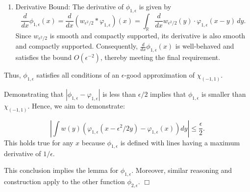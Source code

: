 \documentclass{article}
\newenvironment{proof}{\noindent {\bf Proof:}}{$\Box$ \vspace{2 ex}}
\begin{document}
\begin{proof}
\begin{enumerate}
\begin{equation*} \left| \int_{a}^{b} x e^{-imx^2} e^{-i\alpha x} \, dx \right|, \end{equation*} 
where $a$ and $b$ are fixed. Changing variables, this integral becomes \begin{equation*} \left| \int_{a'}^{b'} \frac{x - \frac{\alpha}{2\sqrt{|m|}}}{|m|} e^{-ix^2} , dx \right|, \end{equation*} where \begin{equation*} a' = a\sqrt{|m|} + \frac{\alpha}{2\sqrt{|m|}} \quad \text{and} \quad b' = b\sqrt{|m|} + \frac{\alpha}{2\sqrt{|m|}}. \end{equation*} This gives the bound \begin{equation*} O\left(\frac{1 + |\alpha| / |m|}{\sqrt{|m|}} \right). 
\end{equation*}

Finally, note that the slope of the linear regions in $\varphi_{1, \epsilon}$ is $O(\epsilon^{-1})$ by definition. This ensures that any contributions from the linear parts are controlled and satisfy the Fourier decay condition.

\item Derivative Bound: The derivative of $\phi_{1, \epsilon}$ is given by
    \begin{equation*}
    \frac{d}{dx} \phi_{1, \epsilon}(x) = \frac{d}{dx} \left( w_{\epsilon^2 / 2} * \varphi_{1, \epsilon} \right)(x) = \int_{\mathbb{R}} \frac{d}{dx} w_{\epsilon^2 / 2}(y) \cdot \varphi_{1, \epsilon}(x - y) \, dy.
    \end{equation*}
  Since $w_{\epsilon^2 / 2}$ is smooth and compactly supported, its derivative is also smooth and compactly supported. Consequently, $\frac{d}{dx} \phi_{1, \epsilon}(x)$ is well-behaved and satisfies the bound $O(\epsilon^{-2})$, thereby meeting the final requirement.

\end{enumerate}
Thus, $\phi_{1, \epsilon}$ satisfies all conditions of an $\epsilon$-good approximation of $\chi_{(-1,1)}$.

Demonstrating that $|\phi_{1,\epsilon}-\varphi_{1,\epsilon}|$ is less than $\epsilon/2$ implies that $\phi_{1,\epsilon}$ is smaller than $\chi_{(-1,1)}$. Hence, we aim to demonstrate:   

\begin{equation*}
\left|\int w(y) \left(\varphi_{1,\epsilon}(x-\epsilon^2/2y) - \varphi_{1,\epsilon}(x)\right) dy\right| \leq \frac{\epsilon}{2}.
\end{equation*}
This holds true for any $x$ because $\phi_{1,\epsilon}$ is defined with lines having a maximum derivative of $1/\epsilon$.  

 


This conclusion implies the lemma for $\phi_{1,\epsilon}$. Moreover, similar reasoning and construction apply to the other function $\phi_{2,\epsilon}$.
\end{proof}
\end{document}
